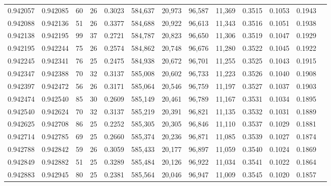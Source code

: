 \begin{tabular}{rrrrrrrrrrrrr}
0.942057 & 0.942085 &    60 &  26 &                                     0.3023 & 584,637 &  20,973 &  96,587 &  11,369 & 0.3515 & 0.1053 & 0.1943 \\
0.942088 & 0.942136 &    51 &  26 &                                     0.3377 & 584,688 &  20,922 &  96,613 &  11,343 & 0.3516 & 0.1051 & 0.1938 \\
0.942138 & 0.942195 &    99 &  37 &                                     0.2721 & 584,787 &  20,823 &  96,650 &  11,306 & 0.3519 & 0.1047 & 0.1929 \\
0.942195 & 0.942244 &    75 &  26 &                                     0.2574 & 584,862 &  20,748 &  96,676 &  11,280 & 0.3522 & 0.1045 & 0.1922 \\
0.942245 & 0.942341 &    76 &  25 &                                     0.2475 & 584,938 &  20,672 &  96,701 &  11,255 & 0.3525 & 0.1043 & 0.1915 \\
0.942347 & 0.942388 &    70 &  32 &                                     0.3137 & 585,008 &  20,602 &  96,733 &  11,223 & 0.3526 & 0.1040 & 0.1908 \\
0.942397 & 0.942472 &    56 &  26 &                                     0.3171 & 585,064 &  20,546 &  96,759 &  11,197 & 0.3527 & 0.1037 & 0.1903 \\
0.942474 & 0.942540 &    85 &  30 &                                     0.2609 & 585,149 &  20,461 &  96,789 &  11,167 & 0.3531 & 0.1034 & 0.1895 \\
0.942540 & 0.942624 &    70 &  32 &                                     0.3137 & 585,219 &  20,391 &  96,821 &  11,135 & 0.3532 & 0.1031 & 0.1889 \\
0.942625 & 0.942708 &    86 &  25 &                                     0.2252 & 585,305 &  20,305 &  96,846 &  11,110 & 0.3537 & 0.1029 & 0.1881 \\
0.942714 & 0.942785 &    69 &  25 &                                     0.2660 & 585,374 &  20,236 &  96,871 &  11,085 & 0.3539 & 0.1027 & 0.1874 \\
0.942788 & 0.942842 &    59 &  26 &                                     0.3059 & 585,433 &  20,177 &  96,897 &  11,059 & 0.3540 & 0.1024 & 0.1869 \\
0.942849 & 0.942882 &    51 &  25 &                                     0.3289 & 585,484 &  20,126 &  96,922 &  11,034 & 0.3541 & 0.1022 & 0.1864 \\
0.942883 & 0.942945 &    80 &  25 &                                     0.2381 & 585,564 &  20,046 &  96,947 &  11,009 & 0.3545 & 0.1020 & 0.1857 \\

\end{tabular}

